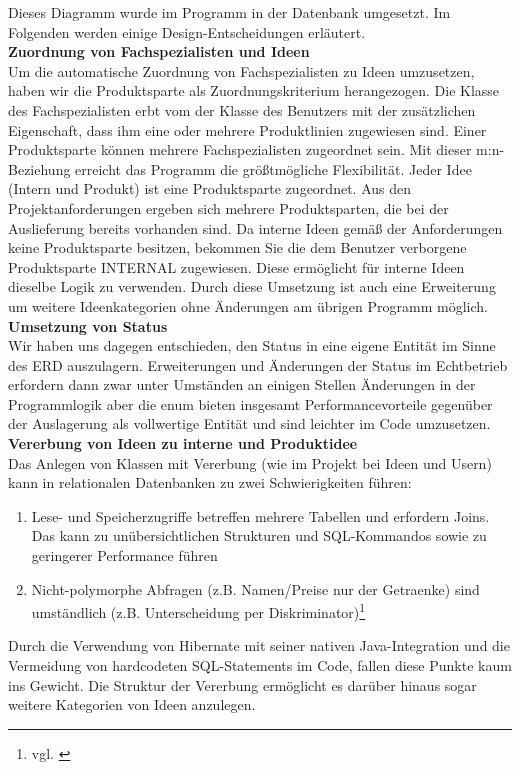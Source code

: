 Dieses Diagramm wurde im Programm in der Datenbank umgesetzt. Im Folgenden werden einige Design-Entscheidungen erläutert.\\
\textbf{Zuordnung von Fachspezialisten und Ideen}\\
Um die automatische Zuordnung von Fachspezialisten zu Ideen umzusetzen, haben wir die Produktsparte als Zuordnungskriterium herangezogen.
Die Klasse des Fachspezialisten erbt vom der Klasse des Benutzers mit der zusätzlichen Eigenschaft, dass ihm eine oder mehrere Produktlinien zugewiesen sind.
Einer Produktsparte können mehrere Fachspezialisten zugeordnet sein. Mit dieser m:n-Beziehung erreicht das Programm die größtmögliche Flexibilität.
Jeder Idee (Intern und Produkt) ist eine Produktsparte zugeordnet. Aus den Projektanforderungen ergeben sich mehrere Produktsparten, die bei der Auslieferung bereits vorhanden sind.
Da interne Ideen gemäß der Anforderungen keine Produktsparte besitzen, bekommen Sie die dem Benutzer verborgene Produktsparte \glqq{}INTERNAL\grqq{} zugewiesen. Diese ermöglicht für interne Ideen dieselbe Logik zu verwenden.
Durch diese Umsetzung ist auch eine Erweiterung um weitere Ideenkategorien ohne Änderungen am übrigen Programm möglich.\\
\textbf{Umsetzung von Status}\\
Wir haben uns dagegen entschieden, den Status in eine eigene Entität im Sinne des ERD auszulagern.
Erweiterungen und Änderungen der Status im Echtbetrieb erfordern dann zwar unter Umständen an einigen Stellen Änderungen in der Programmlogik aber die enum bieten insgesamt Performancevorteile gegenüber der Auslagerung als vollwertige Entität und sind leichter im Code umzusetzen.\\
\textbf{Vererbung von Ideen zu interne und Produktidee}\\
Das Anlegen von Klassen mit Vererbung (wie im Projekt bei Ideen und Usern) kann in relationalen Datenbanken zu zwei Schwierigkeiten führen:
\begin{enumerate}
    \item {Lese- und Speicherzugriffe betreffen mehrere Tabellen und erfordern Joins. Das kann zu unübersichtlichen Strukturen und SQL-Kommandos sowie zu geringerer Performance führen}
    \item {Nicht-polymorphe Abfragen (z.B. Namen/Preise nur der Getraenke) sind umständlich (z.B. Unterscheidung per Diskriminator)\footnote{vgl. \cite{Horn2007}}}
\end{enumerate}
Durch die Verwendung von Hibernate mit seiner nativen Java-Integration und die Vermeidung von hardcodeten SQL-Statements im Code, fallen diese Punkte kaum ins Gewicht. Die Struktur der Vererbung ermöglicht es darüber hinaus sogar weitere Kategorien von Ideen anzulegen.


